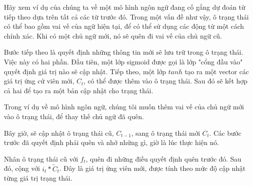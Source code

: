 Hãy xem ví dụ của chúng ta về một mô hình ngôn ngữ đang cố gắng dự đoán từ tiếp theo dựa trên tất cả các từ trước đó.
Trong một vấn đề như vậy, ô trạng thái có thể bao gồm vai vế của ngữ hiện tại, để có thể sử dụng các động từ
một cách chính xác. Khi có một chủ ngữ mới, nó sẽ quên đi vai vế của chủ ngữ cũ.

\begin{figure}[!htb]
\end{figure}

Bước tiếp theo là quyết định những thông tin mới sẽ lưu trữ trong ô trạng thái. Việc này có hai phần. Đầu tiên,
một lớp sigmoid được gọi là lớp "cổng đầu vào" quyết định giá trị nào sẽ cập nhật. Tiếp theo, một lớp \(tanh\)
tạo ra một vector các giá trị ứng cử viên mới, \(C_t\), có thể được thêm vào ô trạng thái. Sau đó sẽ kết hợp  cả hai
để tạo ra một bản cập nhật cho trạng thái.

Trong ví dụ về mô hình ngôn ngữ, chúng tôi muốn thêm vai vế của chủ ngữ mới vào ô trạng thái, để thay thế chủ ngữ đã
quên.
\begin{figure}[!htb]
\end{figure}

Bây giờ, sẽ cập nhật ô trạng thái cũ, \(C_{t-1}\), sang ô trạng thái mới \(C_{t}\). Các bước trước đã quyết định phải
quên và nhớ những gì, giờ là lúc thực hiện nó.

Nhân ô trạng thái cũ với \(f_t\), quên đi những điều quyết định quên trước đó. Sau đó, cộng với \(i_t*\widetilde{C}_t\).
Đây là giá trị ứng viên mới, được tính theo mức độ cập nhật từng giá trị trạng thái.

